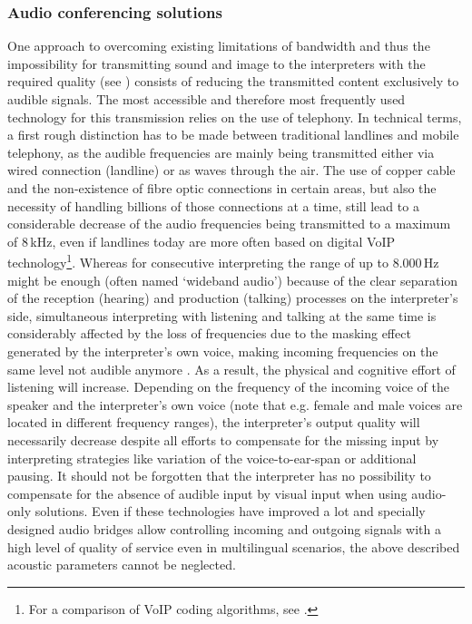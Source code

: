 \documentclass[output=paper]{langsci/langscibook}
\begin{document}
\subsubsection{Audio conferencing solutions}
\label{sub:ziegler:4.3}
One approach to overcoming existing limitations of bandwidth and thus the impossibility for transmitting sound and image to the interpreters with the required quality (see ) consists of reducing the transmitted content exclusively to audible signals. The most accessible and therefore most frequently used technology for this transmission relies on the use of telephony. In technical terms, a first rough distinction has to be made between traditional landlines and mobile telephony, as the audible frequencies are mainly being transmitted either via wired connection (landline) or as waves through the air. The use of copper cable and the non-existence of fibre optic connections in certain areas, but also the necessity of handling billions of those connections at a time, still lead to a considerable decrease of the audio frequencies being transmitted to a maximum of 8\,kHz, even if landlines today are more often based on digital VoIP technology\footnote{For a comparison of VoIP coding algorithms, see \citet{Singh2016}.}. Whereas for consecutive interpreting the range of up to 8.000\,Hz might be enough (often named ‘wideband audio’) because of the clear separation of the reception (hearing) and production (talking) processes on the interpreter’s side, simultaneous interpreting with listening and talking at the same time is considerably affected by the loss of frequencies due to the masking effect generated by the interpreter’s own voice, making incoming frequencies on the same level not audible anymore \citep{Jumpelt1984}. As a result, the physical and cognitive effort of listening will increase. Depending on the frequency of the incoming voice of the speaker and the interpreter’s own voice (note that e.g. female and male voices are located in different frequency ranges), the interpreter’s output quality will necessarily decrease despite all efforts to compensate for the missing input by interpreting strategies like variation of the voice-to-ear-span or additional pausing. It should not be forgotten that the interpreter has no possibility to compensate for the absence of audible input by visual input when using audio-only solutions. Even if these technologies have improved a lot and specially designed audio bridges allow controlling incoming and outgoing signals with a high level of quality of service even in multilingual scenarios, the above described acoustic parameters cannot be neglected.
\end{document}
